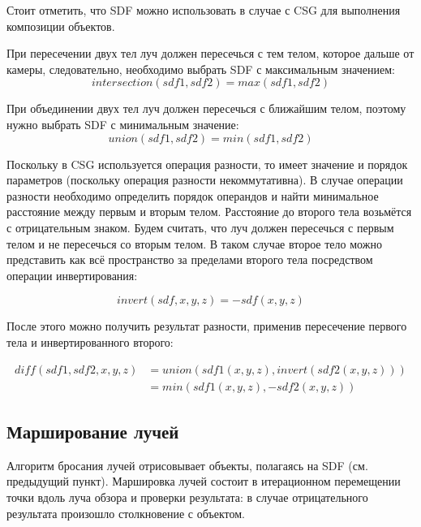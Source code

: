 Стоит  отметить,  что  SDF  можно  использовать  в  случае  с  CSG  для 
выполнения композиции объектов.

При пересечении двух тел луч должен пересечься с тем телом, которое 
дальше от камеры, следовательно, необходимо выбрать SDF с максимальным 
значением:
\begin{equation}
	intersection(sdf1, sdf2) = max(sdf1, sdf2)
	\label{eq:intersection}
\end{equation}

При объединении двух тел луч должен пересечься с ближайшим телом, 
поэтому нужно выбрать SDF с минимальным значение:
\begin{equation}
	union(sdf1, sdf2) = min(sdf1, sdf2)
	\label{eq:union}
\end{equation}

Поскольку в CSG используется операция разности, то имеет  значение и 
порядок параметров (поскольку операция разности некоммутативна).
В случае операции  разности  необходимо  определить  порядок  операндов  и  найти минимальное расстояние между первым и вторым телом.
Расстояние до второго тела  возьмётся  с  отрицательным  знаком.
Будем  считать,  что  луч  должен пересечься с первым телом и не пересечься со вторым телом.
В таком случае второе тело можно представить как всё пространство за пределами второго тела 
посредством операции инвертирования:

\begin{equation}
	invert(sdf, x, y, z) = -sdf(x, y, z)
	\label{eq:invert}
\end{equation}

После этого можно получить результат разности, применив пересечение 
первого тела и инвертированного второго:

\begin{equation}
	\begin{split}
	diff(sdf1, sdf2, x, y, z) &= union(sdf1(x, y, z), invert(sdf2(x, y, z))) \\
	&= min(sdf1(x, y, z), -sdf2(x, y, z))
	\label{eq:diff}
	\end{split}
\end{equation}

\subsection{Марширование лучей}

Алгоритм бросания лучей отрисовывает объекты, полагаясь на SDF (см. 
предыдущий пункт). 
Маршировка лучей состоит в итерационном перемещении точки  вдоль  луча  обзора  и  проверки  результата:  в  случае  отрицательного 
результата произошло столкновение с объектом.

